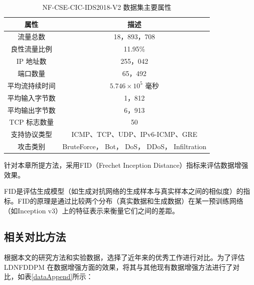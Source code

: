 \documentclass[promaster]{thesis-uestc}
\begin{document}
\begin{table}[h!]
    \centering
    \caption{NF-CSE-CIC-IDS2018-V2 数据集主要属性}
    \begin{tabular}{c||c} \hline\hline
        \textbf{属性} & \textbf{描述} \\ \hline
        流量总数 & 18，893，708 \\ \hline
        良性流量比例 & 11.95\% \\ \hline
        IP 地址数 & 255，042 \\ \hline
        端口数量 & 65，492 \\ \hline
        平均流持续时间 & $5.746 \times 10^5$ 毫秒 \\ \hline
        平均输入字节数 & 1，812 \\ \hline
        平均输出字节数 & 6，913 \\ \hline
        TCP 标志数量 & 50 \\ \hline\hline
        支持协议类型 & ICMP、TCP、UDP、IPv6-ICMP、GRE \\ \hline
        攻击类别 & BruteForce， Bot， DoS， DDoS， Infiltration \\ \hline\hline
    \end{tabular}
    \label{tbl:nf_cse_cic_ids2018_v2}
\end{table}

针对本章所提方法，采用FID（Frechet Inception Distance）指标来评估数据增强效果。

FID是评估生成模型（如生成对抗网络的生成样本与真实样本之间的相似度）的指标。FID的原理是通过比较两个分布（真实数据和生成数据）在某一预训练网络（如Inception v3）上的特征表示来衡量它们之间的差距。

\subsection{相关对比方法}
根据本文的研究方法和实验数据，选择了近年来的优秀工作进行对比。为了评估 LDNFDDPM 在数据增强方面的效果，将其与其他现有数据增强方法进行了对比，如表\ref{dataAppend}所示：
\end{document}
